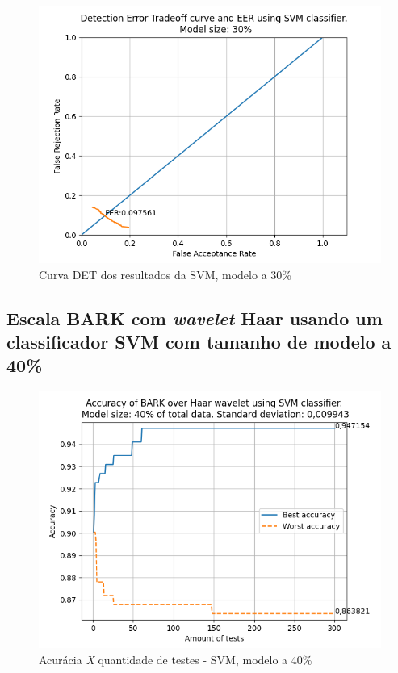 			\begin{figure}[h]
				\centering
				\includegraphics[width=.8\linewidth]{images/results/det/DET_SVM_30}
				\caption{Curva DET dos resultados da SVM, modelo a 30\%}
				\label{fig:detsvm30}
			\end{figure}

			
	
			\forceNewPage
		\subsection{Escala BARK com \textit{wavelet} Haar usando um classificador SVM com tamanho de modelo a 40\%}
			\begin{figure}[ht]
				\centering
				\includegraphics{images/results/confusionMatrices/classifier_SVM_40.png}
				\caption{Acurácia \textit{X} quantidade de testes - SVM, modelo a 40\%}
				\label{fig:classifiersvm40}
			\end{figure}
		
